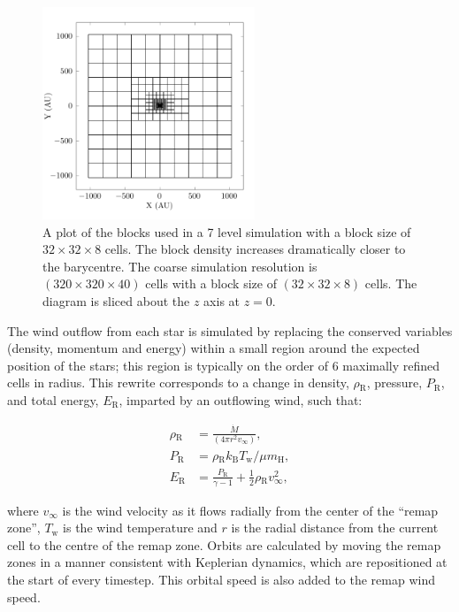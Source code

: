 \documentclass[fleqn,usenatbib]{mnras}
\newcommand{\rms}[1]{\ensuremath{_{\text{#1}}}}
\begin{document}
\begin{figure}
  \centering
  \includegraphics[width=2.5in]{assets/mesh/gridxy.pdf}
  \caption[Static mesh refinement example]{A plot of the blocks used in a 7 level simulation with a block size of $32\times 32 \times 8$ cells. The block density increases dramatically closer to the barycentre. The coarse simulation resolution is $(320\times 320\times 40)$ cells with a block size of $(32\times32\times8)$ cells. The diagram is sliced about the $z$ axis at $z=0$.}
  \label{fig:smr-grid}
\end{figure}

The wind outflow from each star is simulated by replacing the conserved variables (density, momentum and energy) within a small region around the expected position of the stars; this region is typically on the order of 6 maximally refined cells in radius.
This rewrite corresponds to a change in density, $\rho \rms R$, pressure, $P \rms R$, and total energy, $E \rms R$, imparted by an outflowing wind, such that:

\begin{subequations}
  \begin{align}
    \rho \rms R & = \frac{\dot M}{(4 \pi r^2 v_\infty)} , \\
    P \rms R    & = \rho \rms R k \rms B T \rms w / \mu m \rms H , \\
    E\rms R   &  = \frac{P \rms R}{\gamma - 1} + \frac{1}{2} \rho \rms R v_\infty^2 ,
  \end{align}
\end{subequations}

\noindent
where $v_\infty$ is the wind velocity as it flows radially from the center of the ``remap zone'', $T \rms w$ is the wind temperature and $r$ is the radial distance from the current cell to the centre of the remap zone.
Orbits are calculated by moving the remap zones in a manner consistent with Keplerian dynamics, which are repositioned at the start of every timestep.
This orbital speed is also added to the remap wind speed.
\end{document}
